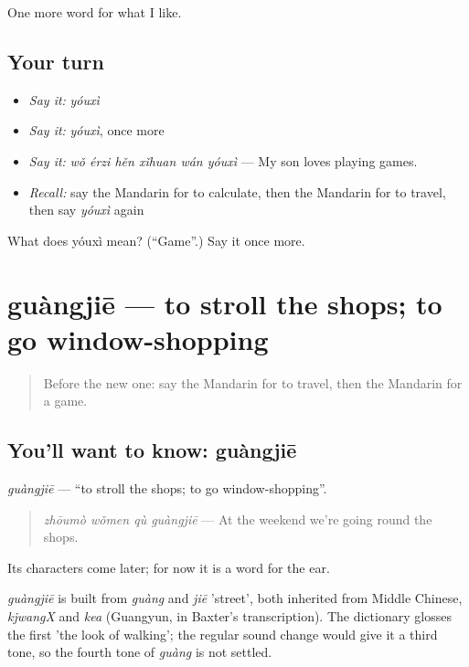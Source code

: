 \begin{grammarlens}[title={What you've built}]
One more word for what I like.
\end{grammarlens}

\subsection*{Your turn}
\begin{itemize}
\raggedright
  \item \emph{Say it:} \emph{yóuxì}
  \item \emph{Say it:} \emph{yóuxì}, once more
  \item \emph{Say it:} \emph{wǒ érzi hěn xǐhuan wán yóuxì} — My son loves playing games.
  \item \emph{Recall:} say the Mandarin for to calculate, then the Mandarin for to travel, then say \emph{yóuxì} again
\end{itemize}

\begin{tcolorbox}[breakable,colback=teal!4,colframe=teal!35!black,title={Before you move on}]
What does yóuxì mean? (\textquotedblleft{}Game\textquotedblright{}.) Say it once more.
\end{tcolorbox}
\section[guàngjiē]{guàngjiē — to stroll the shops; to go window-shopping}

\label{lesson:ZH-C141-guangjie}



\begin{quote}
Before the new one: say the Mandarin for to travel, then the Mandarin for a game.
\end{quote}

\subsection*{You'll want to know: guàngjiē}
\emph{guàngjiē} — \textquotedblleft{}to stroll the shops; to go window-shopping\textquotedblright{}.

\begin{quote}
\emph{zhōumò wǒmen qù guàngjiē} — At the weekend we're going round the shops.
\end{quote}

Its characters come later; for now it is a word for the ear.

\begin{cousinweb}
\emph{guàngjiē} is built from \emph{guàng} and \emph{jiē} 'street', both inherited from Middle Chinese, \emph{kjwangX} and \emph{kea} (Guangyun, in Baxter's transcription). The dictionary glosses the first 'the look of walking'; the regular sound change would give it a third tone, so the fourth tone of \emph{guàng} is not settled.
\end{cousinweb}

